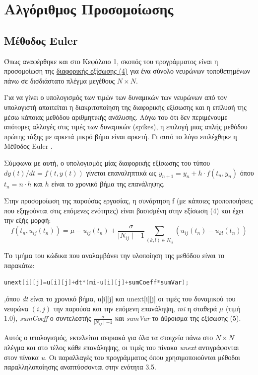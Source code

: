 \documentclass[12pt,a4paper]{article}
\begin{document}
\newpage

\section{Αλγόριθμος Προσομοίωσης}

\subsection{Μέθοδος Euler}

Όπως αναφέρθηκε και στο Κεφάλαιο 1, σκοπός του προγράμματος είναι η προσομοίωση της \hyperlink{difeq}{διαφορικής εξίσωσης (4)} για ένα σύνολο νευρώνων τοποθετημένων πάνω σε δισδιάστατο πλέγμα μεγέθους $N \times N$.

Για να γίνει ο υπολογισμός των τιμών των δυναμικών των νευρώνων από τον υπολογιστή απαιτείται η διακριτοποίηση της διαφορικής εξίσωσης και η επίλυσή της μέσω κάποιας μεθόδου αριθμητικής ανάλυσης. Λόγω του ότι δεν περιμένουμε απότομες αλλαγές στις τιμές των δυναμικών (spikes), η επιλογή μιας απλής μεθόδου πρώτης τάξης με αρκετά μικρό βήμα είναι αρκετή. Γι αυτό το λόγο επιλέχθηκε η Μέθοδος Euler \cite{noauthor_euler_2018}.

Σύμφωνα με αυτή, ο υπολογισμός μίας διαφορικής εξίσωσης του τύπου $dy(t)/{dt}=f(t,y(t))$ γίνεται επαναληπτικά ως $y_{n+1}=y_{n}+h\cdot f(t_{n},y_{n})$ όπου $t_{n}=n\cdot h$ και $h$ είναι το χρονικό βήμα της επανάληψης.

Στην προσομοίωση της παρούσας εργασίας, η συνάρτηση f (με κάποιες τροποποιήσεις που εξηγούνται στις επόμενες ενότητες) είναι βασισμένη στην εξίσωση (4) και έχει την εξής μορφή:
\begin{equation}
f(t_n, u_{ij}(t_n))=\mu - u_{ij}(t_n) + \frac{\sigma}{\mid N_{ij} \mid -1}\sum_{(k,l) \in N_{ij}}^{}(u_{ij}(t_{n})-u_{kl}(t_{n}))
\end{equation}

Το τμήμα του κώδικα που αναλαμβάνει την υλοποίηση της μεθόδου είναι το παρακάτω:
\begin{lstlisting}[language=C,frame=single]
unext[i][j]=u[i][j]+dt*(mi-u[i][j]+sumCoeff*sumVar);
\end{lstlisting}
\noindent ,όπου \textit{dt} είναι το χρονικό βήμα, u[i][j] και unext[i][j] οι τιμές του δυναμικού του νευρώνα $(i,j)$ την παρούσα και την επόμενη επανάληψη, \textit{mi} η σταθερά $\mu$ (τιμή 1.0), \textit{sumCoeff} ο συντελεστής $\frac{\sigma}{\mid N_{ij} \mid -1}$ και \textit{sumVar} το άθροισμα της εξίσωσης (5).

Αυτός ο υπολογισμός, εκτελείται σειριακά για όλα τα στοιχεία πάνω στο $N \times N$ πλέγμα και στο τέλος κάθε επανάληψης, οι τιμές του πίνακα \textit{unext} αντιγράφονται στον πίνακα \textit{u}. Οι παραλλαγές του προγράμματος όπου χρησιμοποιούνται μέθοδοι παραλληλοποίησης αναπτύσσονται στην ενότητα 3.5.
\end{document}
